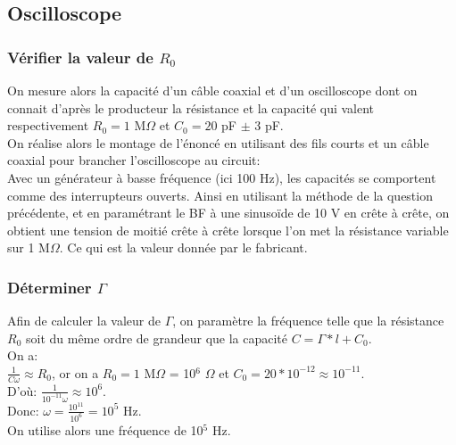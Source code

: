 \documentclass{scrartcl}
\begin{document}
		\subsection{Oscilloscope}
		
			\subsubsection{Vérifier la valeur de $R_0$}
			
				On mesure alors la capacité d'un câble coaxial et d'un oscilloscope dont on connait d'après le producteur la résistance et la capacité qui valent respectivement $R_0 = 1$ M$\Omega$ et $C_0 = 20$ pF $\pm$ 3 pF.\\
				On réalise alors le montage de l'énoncé en utilisant des fils courts et un câble coaxial pour brancher l'oscilloscope au circuit:\\
				
				
				Avec un générateur à basse fréquence (ici 100 Hz), les capacités se comportent comme des interrupteurs ouverts. Ainsi en utilisant la méthode de la question précédente, et en paramétrant le BF à une sinusoïde de 10 V en crête à crête, on obtient une tension de moitié crête à crête lorsque l'on met la résistance variable sur 1 M$\Omega$. Ce qui est la valeur donnée par le fabricant.
			
			\subsubsection{Déterminer $\Gamma$}
			
				Afin de calculer la valeur de $\Gamma$, on paramètre la fréquence telle que la résistance $R_0$ soit du même ordre de grandeur que la capacité $C = \Gamma * l + C_0$.\\
				On a:\\
				$\frac{1}{C\omega} \approx R_0$, or on a $R_0 = 1$ M$\Omega$ = 10$^6$ $\Omega$ et $C_0 = 20 * 10^{-12} \approx 10^{-11}$.\\
				D'où: $\frac{1}{10^{-11}\omega} \approx 10^6$.\\
				Donc: $\omega = \frac{10^{11}}{10^6} = 10^5$ Hz.\\
				On utilise alors une fréquence de 10$^5$ Hz.\\\\
				
\end{document}
